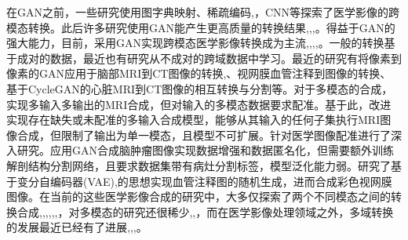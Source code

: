\documentclass[letterpaper]{article} %
\begin{document}
在GAN之前，一些研究使用图字典映射\cite{22burgos2015robust}、稀疏编码\cite{33huang2017simultaneous},\cite{34vemulapalli2015unsupervised}，CNN\cite{36vannguyen2015crossdomain}等探索了医学影像的跨模态转换。此后许多研究使用GAN能产生更高质量的转换结果\cite{1zhao2018modular},\cite{5liang2018generative},\cite{6zhu2017unpaired},\cite{13choi2018stargan:}。得益于GAN的强大能力，目前，采用GAN实现跨模态医学影像转换成为主流\cite{2zhang2018translating},\cite{20nie2017medical},\cite{35osokin2017gans},\cite{36vannguyen2015crossdomain},\cite{40kamnitsas2017unsupervised}。一般的转换基于成对的数据，最近也有研究从不成对的跨域数据中学习\cite{2zhang2018translating}。最近的研究有将像素到像素的GAN应用于脑部MRI到CT图像的转换\cite{20nie2017medical},\cite{40kamnitsas2017unsupervised}、视网膜血管注释到图像的转换\cite{41costa2017towards}、基于CycleGAN\cite{6zhu2017unpaired}的心脏MRI到CT图像的相互转换与分割\cite{20nie2017medical}等。对于多模态的合成，\cite{84chartsias2018multimodal}实现多输入多输出的MRI合成，但对输入的多模态数据要求配准。基于此，\cite{85joyce2017robust}改进实现存在缺失或未配准的多输入合成模型，能够从其输入的任何子集执行MRI图像合成，但限制了输出为单一模态，且模型不可扩展。\cite{66miao2018dilated}针对医学图像配准进行了深入研究。\cite{4shin2018medical}应用GAN合成脑肿瘤图像实现数据增强和数据匿名化，但需要额外训练解剖结构分割网络，且要求数据集带有病灶分割标签，模型泛化能力弱。\cite{41costa2017towards}研究了基于变分自编码器(VAE)\cite{87kingma2014auto-encoding},\cite{88rezende2014stochastic}的思想实现血管注释图的随机生成，进而合成彩色视网膜图像。在当前的这些医学影像合成的研究中，大多仅探索了两个不同模态之间的转换合成\cite{2zhang2018translating},\cite{20nie2017medical},\cite{22burgos2015robust},\cite{34vemulapalli2015unsupervised},\cite{35osokin2017gans},\cite{36vannguyen2015crossdomain},\cite{40kamnitsas2017unsupervised}，对多模态的研究还很稀少\cite{84chartsias2018multimodal},\cite{85joyce2017robust},\cite{4shin2018medical}，而在医学影像处理领域之外，多域转换的发展最近已经有了进展\cite{1zhao2018modular},\cite{5liang2018generative},\cite{13choi2018stargan:},\cite{27isola2017image-to-image}。
\end{document}
